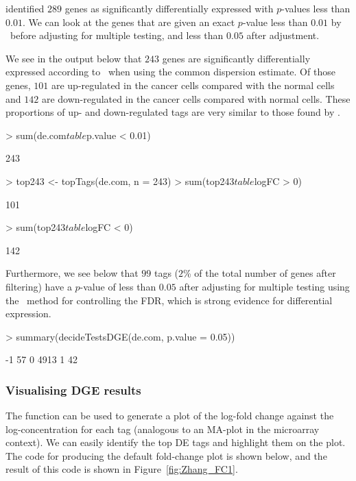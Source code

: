 \citet{Zhang:1997p13} identified $289$ genes as significantly
differentially expressed with $p$-values less than $0.01$. We can look
at the genes that are given an exact $p$-value less than $0.01$ by
\edgeR~before adjusting for multiple testing, and less than $0.05$
after adjustment.

We see in the output below that $243$ genes are significantly
differentially expressed according to \edgeR~when using the common
dispersion estimate. Of those genes, $101$ are up-regulated in the
cancer cells compared with the normal cells and $142$ are
down-regulated in the cancer cells compared with normal cells. These
proportions of up- and down-regulated tags are very similar to those
found by \citet{Zhang:1997p13}.

\begin{Schunk}
\begin{Sinput}
> sum(de.com$table$p.value < 0.01)
\end{Sinput}
\begin{Soutput}
[1] 243
\end{Soutput}
\begin{Sinput}
> top243 <- topTags(de.com, n = 243)
> sum(top243$table$logFC > 0)
\end{Sinput}
\begin{Soutput}
[1] 101
\end{Soutput}
\begin{Sinput}
> sum(top243$table$logFC < 0)
\end{Sinput}
\begin{Soutput}
[1] 142
\end{Soutput}
\end{Schunk}

Furthermore, we see below that $99$ tags ($2$\% of the total number of
genes after filtering) have a $p$-value of less than $0.05$ after
adjusting for multiple testing using the~\citet{Benjamini95} method
for controlling the FDR, which is strong evidence for differential
expression.

\begin{Schunk}
\begin{Sinput}
> summary(decideTestsDGE(de.com, p.value = 0.05))
\end{Sinput}
\begin{Soutput}
   [,1]
-1   57
0  4913
1    42
\end{Soutput}
\end{Schunk}



\subsubsection{Visualising DGE results}
The function  can be used to generate a plot of the
log-fold change against the log-concentration for each tag (analogous
to an MA-plot in the microarray context). We can easily identify the
top DE tags and highlight them on the plot. The code for producing the
default fold-change plot is shown below, and the result of this code
is shown in Figure~\ref{fig:Zhang_FC1}.

